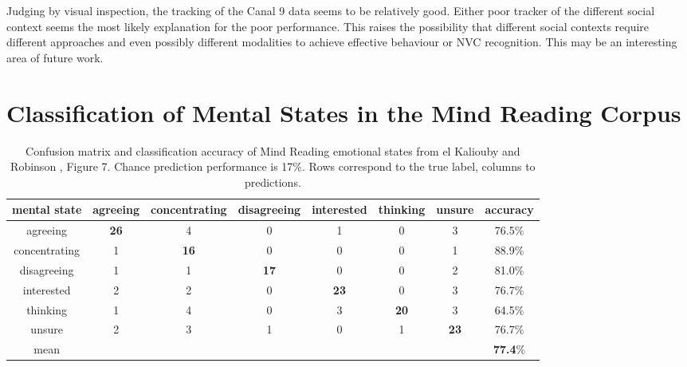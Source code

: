 Judging by visual inspection, the tracking of the Canal 9 data seems to be relatively good. Either poor tracker of the different social context seems the most likely explanation for the poor performance. This raises the possibility that different social contexts require different approaches and even possibly different modalities to achieve effective behaviour or \ac{NVC} recognition. This may be an interesting area of future work.


\section{Classification of Mental States in the Mind Reading Corpus}
\label{SectionMindReading}

\begin{table}[tb]
\centering
\caption[Confusion matrix and classification accuracy of Mind Reading emotional states from el Kaliouby and Robinson \cite{ElKaliouby2004}, Figure 7.]{Confusion matrix and classification accuracy of Mind Reading emotional states from el Kaliouby and Robinson \cite{ElKaliouby2004}, Figure 7. Chance prediction performance is 17\%. Rows correspond to the true label, columns to predictions.}
\scriptsize 
\begin{tabular}{ c || c | c | c | c | c | c || c  }
\hline
mental state&agreeing&concentrating&disagreeing&interested&thinking&unsure&accuracy\\
\hline
agreeing	&\textbf{26}	&4	&0	&1	&0	&3	&76.5\%\\
concentrating	&1	&\textbf{16}	&0	&0	&0	&1	&88.9\%\\
disagreeing	&1	&1	&\textbf{17}	&0	&0	&2	&81.0\%\\
interested	&2	&2	&0	&\textbf{23}	&0	&3	&76.7\%\\
thinking	&1	&4	&0	&3	&\textbf{20}	&3	&64.5\%\\
unsure		&2	&3	&1	&0	&1	&\textbf{23}	&76.7\%\\
mean		&	&	&	&	&	&	&\textbf{77.4}\%\\
\end{tabular}
\normalsize
\label{TableMindReadingEK}
\end{table}

